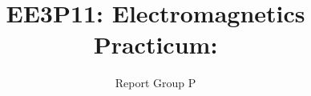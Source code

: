 \documentclass{tudelft-report}
\begin{document}
\frontmatter
\title[tudelft-white]{
EE3P11: \newline 
Electromagnetics Practicum:
}

\subtitle[tudelft-black]{Report Group P}

\makecover[split]


\tableofcontents

\mainmatter


\end{document}
